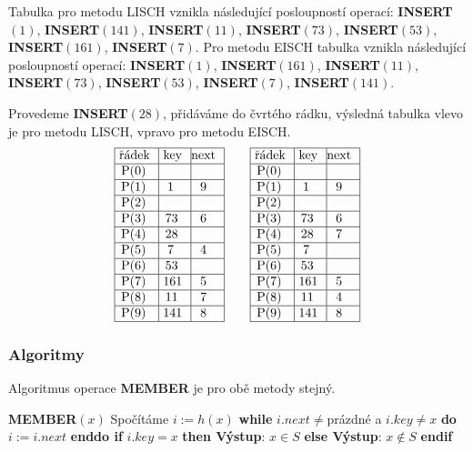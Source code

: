 \documentclass[a4paper,12pt]{article}
\newcommand{\algoritmus}[1]{
  {
  \setlength\fboxrule{0.5pt}

  \begin{boxedminipage}{0.8\textwidth}

 #1
  \end{boxedminipage}

  }
  }
\begin{document}
Tabulka pro metodu LISCH vznikla následující posloupností 
operací:\newline 
{\bf INSERT$(1)$}, {\bf INSERT$(141)$}, {\bf INSERT$(11)$}, {\bf INSERT$
(73)$}, 
{\bf INSERT$(53)$},\newline 
{\bf INSERT$(161)$}, {\bf INSERT$(7)$}.\newline 
Pro metodu EISCH tabulka vznikla následující posloupností 
operací:\newline 
{\bf INSERT$(1)$}, {\bf INSERT$(161)$}, {\bf INSERT$(11)$}, {\bf INSERT$
(73)$}, 
{\bf INSERT$(53)$}, {\bf INSERT$(7)$}, {\bf INSERT$(141)$}. 

Provedeme {\bf INSERT$(28)$}, přidáváme do čvrtého rádku, vý\-sled\-ná tabulka vlevo je pro meto\-du 
LISCH, vpravo pro metodu EISCH.
$$\vbox {\hbox{\vtop{\offinterlineskip\halign{\strut\vrule\ # & \vrule\ # & \vrule\hfil# \hfil\vrule\cr\noalign{\hrule}řádek & key & next \hfil\cr\noalign{\hrule}P(0) & &\hfill \cr\noalign{\hrule}P(1) & 1 & 9 \cr\noalign{\hrule}P(2) & &\hfill \cr\noalign{\hrule}P(3) & 73 & 6 \cr\noalign{\hrule}P(4) & 28 &\hfill \cr\noalign{\hrule}P(5) & 7 & 4 \cr\noalign{\hrule}P(6) & 53 &\hfill \cr\noalign{\hrule}P(7) & 161 & 5 \cr\noalign{\hrule}P(8) & 11 & 7 \cr\noalign{\hrule}P(9) & 141 & 8 \cr\noalign{\hrule}}}\qquad\vtop{\offinterlineskip\halign {\strut\vrule\ # & \vrule\ # & \vrule \hfil # \hfil \vrule\cr\noalign{\hrule}řádek & key & next \hfil \cr\noalign{\hrule}P(0) & &\hfill \cr\noalign{\hrule}P(1) & 1 & 9 \cr\noalign{\hrule}P(2) & &\hfill \cr\noalign{\hrule}P(3) & 73 & 6 \cr\noalign{\hrule}P(4) & 28 & 7 \cr\noalign{\hrule}P(5) & 7 & \hfill \cr\noalign{\hrule}P(6) & 53 & \hfill \cr\noalign{\hrule}P(7) & 161 & 5 \cr\noalign{\hrule}P(8) & 11 & 4  \cr\noalign{\hrule}P(9) & 141 & 8 \cr\noalign{\hrule}}}}}$$

\subsubsection{Algoritmy}

Algoritmus operace {\bf MEMBER} je pro obě metody stejný.


\algoritmus{{\bf MEMBER$(x)$}\newline 
Spočítáme $i:=h(x)$\newline 
{\bf \textsf{while}} $i.next\ne$prázdné a $i.key\ne x$ {\bf \textsf{do}} $i:=i.
next$ {\bf \textsf{enddo} \newline 
\textsf{if}} $i.key=x$ {\bf \textsf{then} Výstup}: $x\in S$ {\bf \textsf{else} Výstup}: $
x\notin S$ {\bf \textsf{endif}}
}
\end{document}
